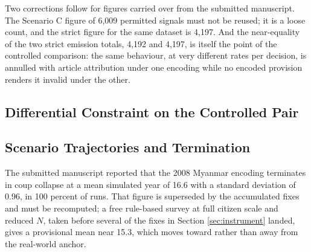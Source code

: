 \documentclass{ieeeaccess}
\newif\ifpendingvisible
\newcommand{\todo}[1]{%
  \ifpendingvisible\textcolor{red}{\textbf{[\MakeUppercase{#1}]}}\fi}
\begin{document}
Two corrections follow for figures carried over from the submitted
manuscript. The Scenario C figure of 6,009 permitted signals must not be
reused; it is a loose count, and the strict figure for the same dataset
is 4,197. And the near-equality of the two strict emission totals, 4,192
and 4,197, is itself the point of the controlled comparison: the same
behaviour, at very different rates per decision, is annulled with
article attribution under one encoding while no encoded provision
renders it invalid under the other.

\subsection{Differential Constraint on the Controlled Pair}
\todo{PENDING CAMPAIGN: the headline enforcement result at the campaign
$N$ with structured logging. Required quantities: emitted and
intercepted coup signals per scenario and per role, the interception
rate with its residual, the per-decision emission rate for each arm, and
the count of enforcement records produced by each encoding in the final
roster. State the article label attached to each interception and whose
article numbering it is.}

\subsection{Scenario Trajectories and Termination}
\todo{PENDING CAMPAIGN: trajectories for the seven indicators across
the final roster at the campaign $N$, with the bound-arrival year marked
on every series that reaches a bound.}

The submitted manuscript reported that the 2008 Myanmar encoding
terminates in coup collapse at a mean simulated year of 16.6 with a
standard deviation of 0.96, in 100 percent of runs. That figure is
superseded by the accumulated fixes and must be recomputed; a free
rule-based survey at full citizen scale and reduced $N$, taken before
several of the fixes in Section \ref{sec:instrument} landed, gives a
provisional mean near 15.3, which moves toward rather than away from the
real-world anchor.
\todo{PENDING CAMPAIGN: the mean final year and standard deviation for
every terminating scenario at the campaign $N$. Until then no collapse
year is stated as final anywhere in this paper. Note for the drafting
team: the mean count of internet shutdowns before collapse is a
different quantity from the collapse year and has been conflated with it
repeatedly; it must never be printed as a year.}
\end{document}
